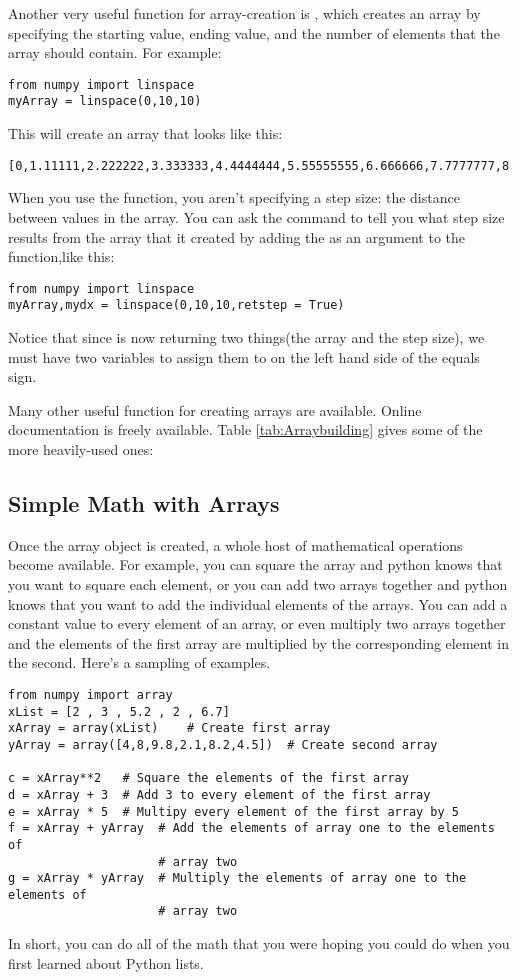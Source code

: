  Another very useful function for array-creation is ,
which creates an array by specifying the starting value, ending value,
and the number of elements that the array should contain.  For example:
\begin{Verbatim}
from numpy import linspace
myArray = linspace(0,10,10)
\end{Verbatim}
This will create an array that looks like this:
\begin{Verbatim}
[0,1.11111,2.222222,3.333333,4.4444444,5.55555555,6.666666,7.7777777,8.8888888,10]
\end{Verbatim}
When you use the  function, you aren't specifying a
step size: the distance between values in the array.  You can ask the
 command to tell you what step size results from the
array that it created by adding the  as an
argument to the function,like this:
\begin{Verbatim}
from numpy import linspace
myArray,mydx = linspace(0,10,10,retstep = True)
\end{Verbatim}
Notice that since  is now returning two things(the
array and the step size), we must have two variables to assign them to
on the left hand side of the equals sign.

Many other useful function for creating arrays are available.  Online
documentation is freely available.  Table \ref{tab:Arraybuilding}
gives some of the more heavily-used ones:

\subsection*{Simple Math with Arrays}
Once the array object is created, a whole host of mathematical
operations become available.  For example, you can square the array
and python knows that you want to square each element, or you can add
two arrays together and python knows that you want to add the
individual elements of the arrays.  You can add a constant value to
every element of an array, or even multiply two arrays together and
the elements of the first array are multiplied by the corresponding
element in the second.  Here's a sampling of examples.
\begin{Verbatim}
from numpy import array
xList = [2 , 3 , 5.2 , 2 , 6.7]
xArray = array(xList)    # Create first array
yArray = array([4,8,9.8,2.1,8.2,4.5])  # Create second array

c = xArray**2   # Square the elements of the first array
d = xArray + 3  # Add 3 to every element of the first array
e = xArray * 5  # Multipy every element of the first array by 5
f = xArray + yArray  # Add the elements of array one to the elements of
                     # array two
g = xArray * yArray  # Multiply the elements of array one to the elements of
                     # array two
\end{Verbatim}
In short, you can do all of the math that you were hoping you could do
when you first learned about Python lists.

